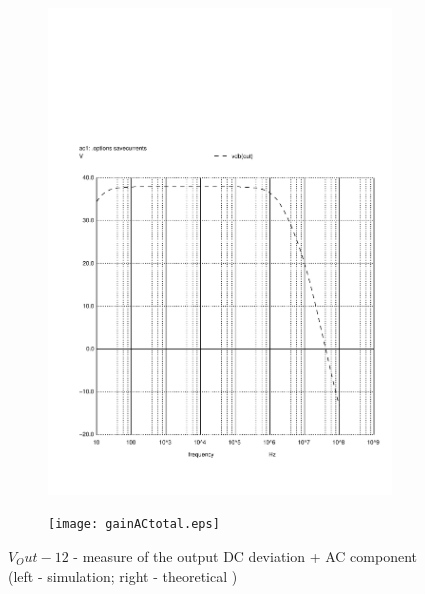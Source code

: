\begin{figure}[h]
  \centering
  \begin{subfigure}{0.23\textwidth}
    \includegraphics[width=\linewidth, clip]{vo2f.pdf}
    \label{fig:output1}
  \end{subfigure}
  \begin{subfigure}{0.23\textwidth}
    \texttt{[image: gainACtotal.eps]}
    \label{fig:output2}
  \end{subfigure}
  \caption{\small $V_Out - 12$ - measure of the output DC deviation + AC component (left - simulation; right - theoretical )}
  \label{output_deviation}
\end{figure}


